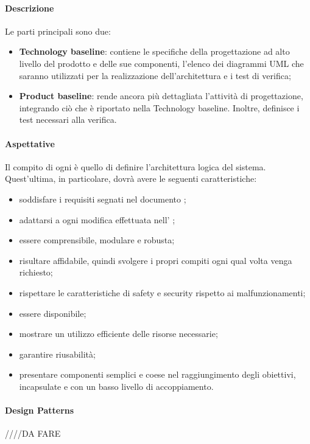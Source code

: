 \paragraph{Descrizione}
Le parti principali sono due:
\begin{itemize}
\item \textbf{Technology baseline}: contiene le specifiche della progettazione ad alto livello del prodotto e delle sue componenti,  l'elenco dei diagrammi UML che saranno utilizzati per la realizzazione dell'architettura e i test di verifica;
\item \textbf{Product baseline}: rende ancora più dettagliata l'attività di progettazione, integrando ciò che è riportato nella Technology baseline. Inoltre, definisce i test necessari alla verifica.
\end{itemize}
\paragraph{Aspettative}
Il compito di ogni \prog{} è quello di definire l'architettura logica del sistema. Quest'ultima, in particolare, dovrà avere le seguenti caratteristiche:
\begin{itemize}
\item soddisfare i requisiti segnati nel documento \AdR{};
\item adattarsi a ogni modifica effettuata nell' \AdR{};
\item essere comprensibile, modulare e robusta;
\item risultare affidabile, quindi svolgere i propri compiti ogni qual volta venga richiesto;
\item rispettare le caratteristiche di safety e security rispetto ai malfunzionamenti;
\item essere disponibile;
\item mostrare un utilizzo efficiente delle risorse necessarie;
\item garantire riusabilità;
\item presentare componenti semplici e coese nel raggiungimento degli obiettivi, incapsulate e con un basso livello di accoppiamento.
\end{itemize}
\paragraph{Design Patterns}
////DA FARE
